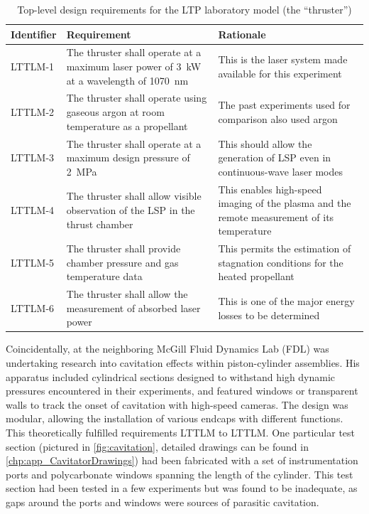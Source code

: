             \begin{table}[h]
                \renewcommand{\arraystretch}{1.3}
                \centering
                \caption[Top-level design requirements for the LTP laboratory model]{Top-level design requirements for the LTP laboratory model (the ``thruster'')}
                \label{tab:lttmReq}
                \begin{tabular}{l>{\raggedright}p{}p{}<{\raggedright}}
                    \toprule
                    \textbf{Identifier}  & \textbf{Requirement}   & \textbf{Rationale} \\
                    \midrule
                    LTTLM-1     & The thruster shall operate at a maximum laser power of \qty{3}{kW} at a wavelength of \qty{1070}{nm}    & This is the laser system made available for this experiment \\
                    LTTLM-2     & The thruster shall operate using gaseous argon at room temperature as a propellant & The past experiments used for comparison also used argon \\
                    LTTLM-3     & The thruster shall operate at a maximum design pressure of 2~\unit{MPa} & This should allow the generation of LSP even in continuous-wave laser modes \\
                    LTTLM-4     & The thruster shall allow visible observation of the LSP in the thrust chamber & This enables high-speed imaging of the plasma and the remote measurement of its temperature \\
                    LTTLM-5     & The thruster shall provide chamber pressure and gas temperature data   & This permits the estimation of stagnation conditions for the heated propellant \\
                    LTTLM-6     & The thruster shall allow the measurement of absorbed laser power   & This is one of the major energy losses to be determined \\
                    \bottomrule
                \end{tabular}
            \end{table}

            Coincidentally, \textcite{kokkalisOnsetCavitationDynamically2023} at the neighboring McGill Fluid Dynamics Lab (FDL) was undertaking research into cavitation effects within piston-cylinder assemblies. His apparatus included cylindrical sections designed to withstand high dynamic pressures encountered in their experiments, and featured windows or transparent walls to track the onset of cavitation with high-speed cameras. The design was modular, allowing the installation of various endcaps with different functions. This theoretically fulfilled requirements LTTLM to LTTLM. One particular test section (pictured in \autoref{fig:cavitation}, detailed drawings can be found in \autoref{chp:app_CavitatorDrawings}) had been fabricated with a set of instrumentation ports and polycarbonate windows spanning the length of the cylinder. This test section had been tested in a few experiments but was found to be inadequate, as gaps around the ports and windows were sources of parasitic cavitation.

